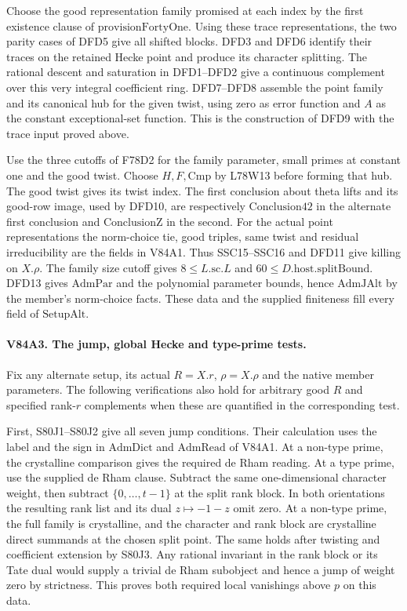 Choose the good representation family promised at each index by
the first existence clause of $\mathrm{provisionFortyOne}$.
Using these trace representations, the two parity cases of DFD5
give all shifted blocks. DFD3 and DFD6 identify their traces on
the retained Hecke point and produce its character splitting.
The rational descent and saturation in DFD1--DFD2 give a
continuous complement over this very integral coefficient ring.
DFD7--DFD8 assemble the point family and its canonical hub for
the given twist, using zero as error function and $A$ as the
constant exceptional-set function. This is the construction of
DFD9 with the trace input proved above.

Use the three cutoffs of F78D2 for the family parameter, small
primes at constant one and the good twist. Choose $H,F,\mathrm{Cmp}$
by L78W13 before forming that hub. The good twist gives its twist
index. The first conclusion about theta lifts and its good-row
image, used by DFD10, are respectively $\mathrm{Conclusion42}$
in the alternate first conclusion and $\mathrm{ConclusionZ}$ in
the second. For the actual point representations the norm-choice
tie, good triples, same twist and residual irreducibility are the
fields in V84A1. Thus SSC15--SSC16 and DFD11 give killing on
$X.\rho$. The family size cutoff gives $8\le L.\mathrm{sc}.L$ and
$60\le D.\mathrm{host.splitBound}$. DFD13 gives $\mathrm{AdmPar}$
and the polynomial parameter bounds, hence $\mathrm{AdmJAlt}$ by
the member's norm-choice facts. These data and the supplied
finiteness fill every field of $\mathrm{SetupAlt}$.

\paragraph{V84A3. The jump, global Hecke and type-prime tests.}
Fix any alternate setup, its actual $R=X.r$, $\rho=X.\rho$ and
the native member parameters. The following verifications also
hold for arbitrary good $R$ and specified rank-$r$ complements
when these are quantified in the corresponding test.

First, S80J1--S80J2 give all seven jump conditions. Their
calculation uses the label and the sign in
$\mathrm{AdmDict}$ and $\mathrm{AdmRead}$ of V84A1. At a non-type
prime, the crystalline comparison gives the required de Rham
reading. At a type prime, use the supplied de Rham clause.
Subtract the same one-dimensional character weight, then subtract
$\{0,\ldots,t-1\}$ at the split rank block. In both orientations
the resulting rank list and its dual $z\mapsto-1-z$ omit zero.
At a non-type prime, the full family is crystalline, and the
character and rank block are crystalline direct summands at the
chosen split point. The same holds after twisting and coefficient
extension by S80J3. Any rational invariant in the rank block or
its Tate dual would supply a trivial de Rham subobject and hence
a jump of weight zero by strictness. This proves both required
local vanishings above $p$ on this data.

